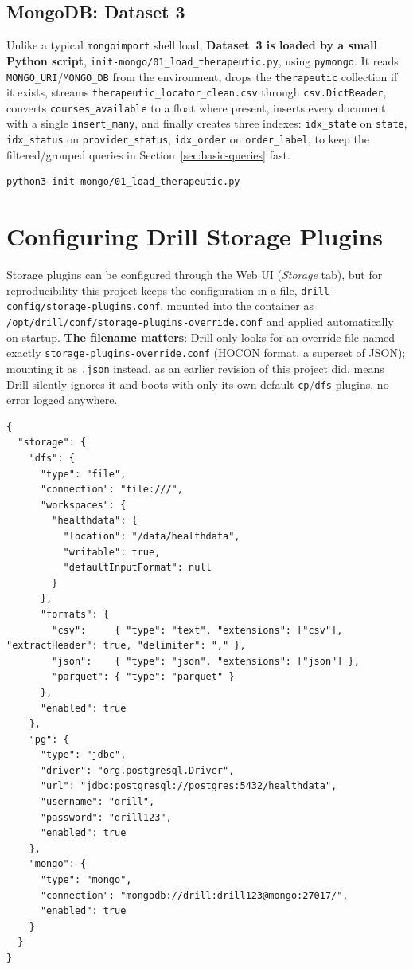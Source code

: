 \documentclass[11pt,a4paper]{article}
\begin{document}
\subsection{MongoDB: Dataset 3}
Unlike a typical \texttt{mongoimport} shell load, \textbf{Dataset~3 is loaded by a small
Python script}, \texttt{init-mongo/01\_load\_therapeutic.py}, using \texttt{pymongo}.
It reads \texttt{MONGO\_URI}/\texttt{MONGO\_DB} from the environment, drops the
\texttt{therapeutic} collection if it exists, streams
\texttt{therapeutic\_locator\_clean.csv} through \texttt{csv.DictReader}, converts
\texttt{courses\_available} to a float where present, inserts every document with a
single \texttt{insert\_many}, and finally creates three indexes:
\texttt{idx\_state} on \texttt{state}, \texttt{idx\_status} on
\texttt{provider\_status}, \texttt{idx\_order} on \texttt{order\_label}, to keep the
filtered/grouped queries in Section~\ref{sec:basic-queries} fast.

\begin{lstlisting}[style=bashstyle]
python3 init-mongo/01_load_therapeutic.py
\end{lstlisting}



\section{Configuring Drill Storage Plugins}
\label{sec:plugins}

Storage plugins can be configured through the Web UI (\emph{Storage} tab), but for
reproducibility this project keeps the configuration in a file,
\texttt{drill-config/storage-plugins.conf}, mounted into the container as
\texttt{/opt/drill/conf/storage-plugins-override.conf} and applied automatically on
startup. \textbf{The filename matters}: Drill only looks for an override file named
exactly \texttt{storage-plugins-override.conf} (HOCON format, a superset of JSON); mounting it as \texttt{.json} instead, as
an earlier revision of this project did, means Drill silently ignores it and boots
with only its own default \texttt{cp}/\texttt{dfs} plugins, no error logged anywhere.

\begin{lstlisting}[style=jsonstyle, caption={drill-config/storage-plugins.conf -- the three plugins used throughout this tutorial.}]
{
  "storage": {
    "dfs": {
      "type": "file",
      "connection": "file:///",
      "workspaces": {
        "healthdata": {
          "location": "/data/healthdata",
          "writable": true,
          "defaultInputFormat": null
        }
      },
      "formats": {
        "csv":     { "type": "text", "extensions": ["csv"], "extractHeader": true, "delimiter": "," },
        "json":    { "type": "json", "extensions": ["json"] },
        "parquet": { "type": "parquet" }
      },
      "enabled": true
    },
    "pg": {
      "type": "jdbc",
      "driver": "org.postgresql.Driver",
      "url": "jdbc:postgresql://postgres:5432/healthdata",
      "username": "drill",
      "password": "drill123",
      "enabled": true
    },
    "mongo": {
      "type": "mongo",
      "connection": "mongodb://drill:drill123@mongo:27017/",
      "enabled": true
    }
  }
}
\end{lstlisting}
\end{document}
